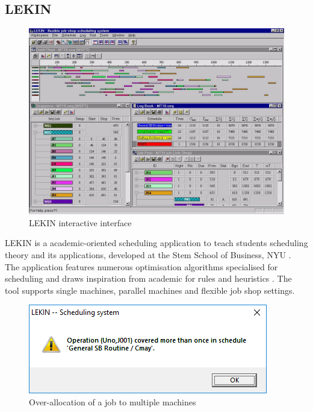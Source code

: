 \subsection{LEKIN}

\begin{figure}[H]
	\begin{center}
		\includegraphics[width=\linewidth]{figures/lekin_gui.jpg}
	\end{center}
	\caption{LEKIN interactive interface \cite{lekin}}
\end{figure}

LEKIN is a academic-oriented scheduling application to teach students scheduling theory and its applications, developed at the Stem School of Business, NYU \cite{lekin}. The application features numerous optimisation algorithms specialised for scheduling and draws inspiration from academic for rules and heuristics \cite{sta}. The tool supports single machines, parallel machines and flexible job shop settings.

\begin{figure}[H]
	\begin{center}
		\includegraphics[scale=0.8]{figures/lekin_overallocated.png}
	\end{center}
	\caption{Over-allocation of a job to multiple machines}
\end{figure}

